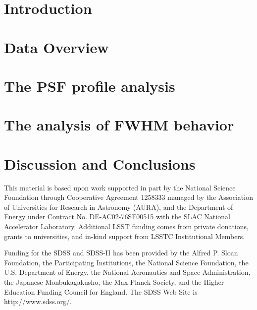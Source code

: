 \documentclass[12pt,preprint]{aastex}
\begin{document}
\section{Introduction}

 

\section{Data Overview} 

 


\section{The PSF profile analysis}

 

\section{The analysis of FWHM behavior} 

 

\section{Discussion and Conclusions} 

 


\acknowledgments

This material is based upon work supported in part by the National Science Foundation through
Cooperative Agreement 1258333 managed by the Association of Universities for Research in Astronomy
(AURA), and the Department of Energy under Contract No. DE-AC02-76SF00515 with the SLAC National
Accelerator Laboratory. Additional LSST funding comes from private donations, grants to universities,
and in-kind support from LSSTC Institutional Members.

Funding for the SDSS and SDSS-II has been provided by the Alfred
P. Sloan Foundation, the Participating Institutions, the National
Science Foundation, the U.S. Department of Energy, the National
Aeronautics and Space Administration, the Japanese Monbukagakusho, the
Max Planck Society, and the Higher Education Funding Council for
England. The SDSS Web Site is http://www.sdss.org/.



\end{document}
